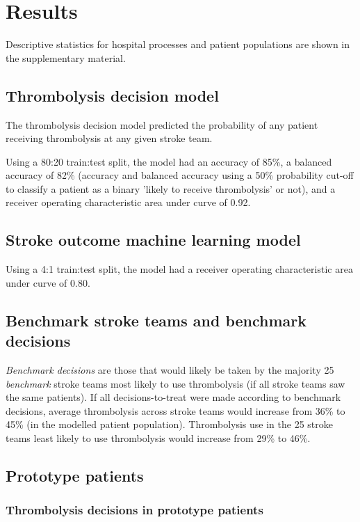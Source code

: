 \section{Results}

Descriptive statistics for hospital processes and patient populations are shown in the supplementary material.

\subsection{Thrombolysis decision model}

The thrombolysis decision model predicted the probability of any patient receiving thrombolysis at any given stroke team.

Using a 80:20 train:test split, the model had an accuracy of 85\%, a balanced accuracy of 82\% (accuracy and balanced accuracy using a 50\% probability cut-off to classify a patient as a binary 'likely to receive thrombolysis' or not), and a receiver operating characteristic area under curve of 0.92.


\subsection{Stroke outcome machine learning model}

Using a 4:1 train:test split, the model had a receiver operating characteristic area under curve of 0.80.

\subsection{Benchmark stroke teams and benchmark decisions}

\textit{Benchmark decisions} are those that would likely be taken by the majority 25 \textit{benchmark} stroke teams most likely to use thrombolysis (if all stroke teams saw the same patients). If all decisions-to-treat were made according to benchmark decisions, average thrombolysis across stroke teams would increase from 36\% to 45\% (in the modelled patient population). Thrombolysis use in the 25 stroke teams least likely to use thrombolysis would increase from 29\% to 46\%.

\subsection{Prototype patients}

\subsubsection{Thrombolysis decisions in prototype patients}

